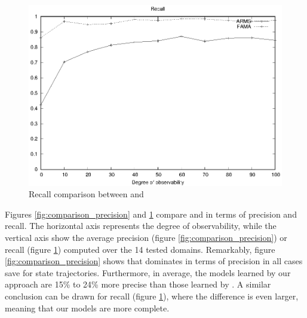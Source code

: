 \begin{figure}[hbt!]
	\centering
	\includegraphics[width=.8\linewidth]{figures/comparison_recall.eps}
	\caption{Recall comparison between \FAMA and \ARMS}
	\label{fig:comparison_recall}
\end{figure}

Figures \ref{fig:comparison_precision} and \ref{fig:comparison_recall} compare \FAMA and \ARMS in terms of precision and recall. The horizontal axis represents the degree of observability, while the vertical axis show the average precision (figure \ref{fig:comparison_precision}) or recall (figure \ref{fig:comparison_recall}) computed over the 14 tested domains. Remarkably, figure \ref{fig:comparison_precision} shows that \FAMA dominates in terms of precision in all cases save for \FO state trajectories. Furthermore, in average, the models learned by our approach are 15\% to 24\% more precise than those learned by \ARMS. A similar conclusion can be drawn for recall (figure \ref{fig:comparison_recall}), where the difference is even larger, meaning that our models are more complete.



